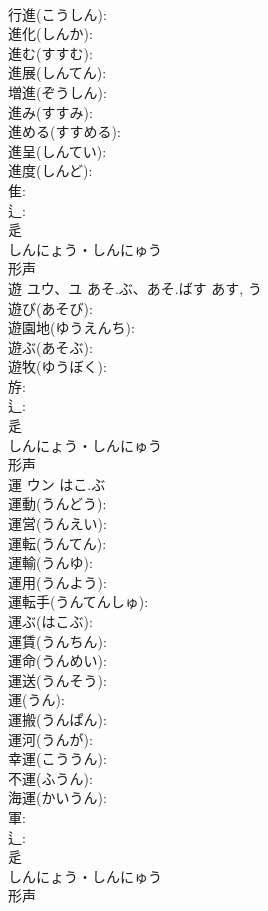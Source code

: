 \documentclass[8pt]{extreport}
\begin{document}
\begin{CJK}{UTF8}{min}
\\	行進(こうしん): 
\\	進化(しんか): 
\\	進む(すすむ): 
\\	進展(しんてん): 
\\	増進(ぞうしん): 
\\	進み(すすみ): 
\\	進める(すすめる): 
\\	進呈(しんてい): 
\\	進度(しんど): 
\\	隹: 
\\	辶: 
\\	辵	
\\	しんにょう・しんにゅう	
\\	形声 
\\	遊	ユウ、ユ	あそ.ぶ、あそ.ばす	あす, う	
\\	遊び(あそび): 
\\	遊園地(ゆうえんち): 
\\	遊ぶ(あそぶ): 
\\	遊牧(ゆうぼく): 
\\	斿: 
\\	辶: 
\\	辵	
\\	しんにょう・しんにゅう	
\\	形声 
\\	運	ウン	はこ.ぶ		
\\	運動(うんどう): 
\\	運営(うんえい): 
\\	運転(うんてん): 
\\	運輸(うんゆ): 
\\	運用(うんよう): 
\\	運転手(うんてんしゅ): 
\\	運ぶ(はこぶ): 
\\	運賃(うんちん): 
\\	運命(うんめい): 
\\	運送(うんそう): 
\\	運(うん): 
\\	運搬(うんぱん): 
\\	運河(うんが): 
\\	幸運(こううん): 
\\	不運(ふうん): 
\\	海運(かいうん): 
\\	軍: 
\\	辶: 
\\	辵	
\\	しんにょう・しんにゅう	
\\	形声 

\end{CJK}
\end{document}
